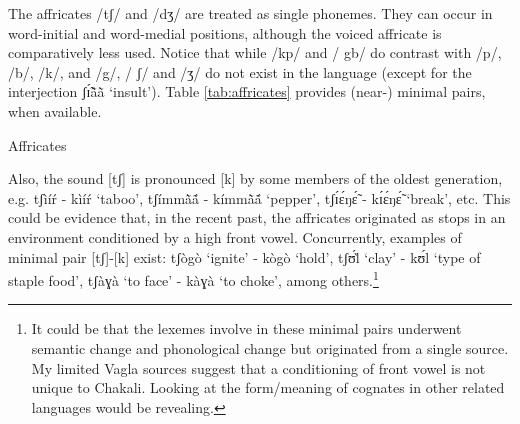 The affricates /{\sls tʃ}/ and  /{\sls dʒ}/ are  treated as single phonemes. 
They 
can occur in word-initial and word-medial positions, although the voiced 
affricate is comparatively less used. Notice that while  /{\sls kp}/ and /{\sls 
gb}/ do contrast with /{\sls p}/, /{\sls b}/,  /{\sls k}/,  and /{\sls g}/,   
/{\sls 
ʃ}/ and  /{\sls ʒ}/ do not exist in the language (except for the interjection 
{\sls ʃɪ̃́ã̀ã̀}  `insult').  Table \ref{tab:affricates} provides (near-) 
minimal 
pairs, when available. 


\begin{table}[!htb] \small
\centering
\caption{Affricates\label{tab:affricates}}

\quad
{}
\end{table}

Also, the sound [{\sls tʃ}] is pronounced [{\sls k}]  by some members of the 
oldest generation, e.g. {\sls tʃìíŕ} - {\sls kìíŕ} `taboo',   {\sls 
tʃímmã̀ã́} - {\sls kímmã̀ã́} `pepper',  {\sls tʃɪ́ɛ́ŋɛ̃́} -  {\sls 
kɪ́ɛ́ŋɛ̃́} 
`break', etc.  This could be evidence that, in the  recent past, the affricates 
originated as  stops in an environment conditioned by a high front vowel.  
Concurrently,  examples of minimal pair [{\sls tʃ}]-[{\sls k}] exist:  {\sls 
tʃògò} 
 `ignite' - {\sls kògò} `hold', {\sls tʃʊ́l̀} `clay' -  {\sls kʊ́l} `type of 
staple 
food',  {\sls tʃàɣà} `to face'  -  {\sls kàɣà} `to choke',  among 
others.\footnote{It could be that the lexemes involve in these minimal pairs 
underwent semantic change and phonological change but originated from a single 
source.  My limited Vagla sources suggest that a conditioning of front vowel is 
not unique to Chakali. Looking at the form/meaning of cognates in other related 
languages would be revealing.}

